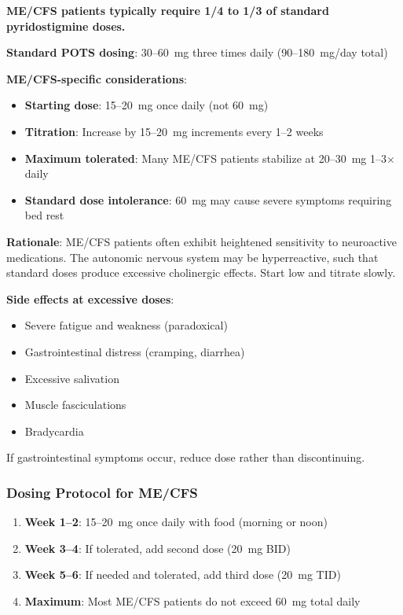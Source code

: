 \begin{warning}
\label{warn:mestinon-mecfs-dosing}
\textbf{ME/CFS patients typically require 1/4 to 1/3 of standard pyridostigmine doses.}

\textbf{Standard POTS dosing}: 30--60~mg three times daily (90--180~mg/day total)

\textbf{ME/CFS-specific considerations}:
\begin{itemize}
    \item \textbf{Starting dose}: 15--20~mg once daily (not 60~mg)
    \item \textbf{Titration}: Increase by 15--20~mg increments every 1--2 weeks
    \item \textbf{Maximum tolerated}: Many ME/CFS patients stabilize at 20--30~mg 1--3$\times$ daily
    \item \textbf{Standard dose intolerance}: 60~mg may cause severe symptoms requiring bed rest
\end{itemize}

\textbf{Rationale}: ME/CFS patients often exhibit heightened sensitivity to neuroactive medications. The autonomic nervous system may be hyperreactive, such that standard doses produce excessive cholinergic effects. Start low and titrate slowly.

\textbf{Side effects at excessive doses}:
\begin{itemize}
    \item Severe fatigue and weakness (paradoxical)
    \item Gastrointestinal distress (cramping, diarrhea)
    \item Excessive salivation
    \item Muscle fasciculations
    \item Bradycardia
\end{itemize}

If gastrointestinal symptoms occur, reduce dose rather than discontinuing.
\end{warning}

\subsubsection{Dosing Protocol for ME/CFS}

\begin{enumerate}
    \item \textbf{Week 1--2}: 15--20~mg once daily with food (morning or noon)
    \item \textbf{Week 3--4}: If tolerated, add second dose (20~mg BID)
    \item \textbf{Week 5--6}: If needed and tolerated, add third dose (20~mg TID)
    \item \textbf{Maximum}: Most ME/CFS patients do not exceed 60~mg total daily
\end{enumerate}

